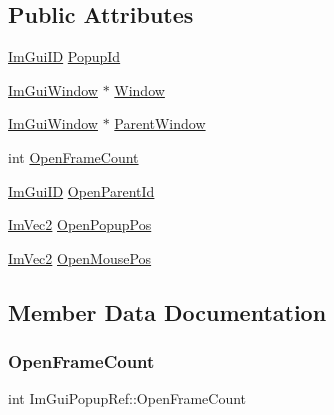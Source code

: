 \subsection*{Public Attributes}
\begin{DoxyCompactItemize}
\item 
\mbox{\hyperlink{imgui_8h_a1785c9b6f4e16406764a85f32582236f}{Im\+Gui\+ID}} \mbox{\hyperlink{struct_im_gui_popup_ref_a7037780575e28439414d28625a495bad}{Popup\+Id}}
\item 
\mbox{\hyperlink{struct_im_gui_window}{Im\+Gui\+Window}} $\ast$ \mbox{\hyperlink{struct_im_gui_popup_ref_a471027209038d1d59280a84c8d236f34}{Window}}
\item 
\mbox{\hyperlink{struct_im_gui_window}{Im\+Gui\+Window}} $\ast$ \mbox{\hyperlink{struct_im_gui_popup_ref_a7925cc312e5632661e0e6a2195af21b2}{Parent\+Window}}
\item 
int \mbox{\hyperlink{struct_im_gui_popup_ref_ae234b7164134a20ab0f25fd3987692ed}{Open\+Frame\+Count}}
\item 
\mbox{\hyperlink{imgui_8h_a1785c9b6f4e16406764a85f32582236f}{Im\+Gui\+ID}} \mbox{\hyperlink{struct_im_gui_popup_ref_a4a1431f380b456cbdacf550986715609}{Open\+Parent\+Id}}
\item 
\mbox{\hyperlink{struct_im_vec2}{Im\+Vec2}} \mbox{\hyperlink{struct_im_gui_popup_ref_a2e16a9956b94737f177d669bbaf68761}{Open\+Popup\+Pos}}
\item 
\mbox{\hyperlink{struct_im_vec2}{Im\+Vec2}} \mbox{\hyperlink{struct_im_gui_popup_ref_ac7c323da1a0ab658494a7d875facc200}{Open\+Mouse\+Pos}}
\end{DoxyCompactItemize}


\subsection{Member Data Documentation}
\mbox{\label{struct_im_gui_popup_ref_ae234b7164134a20ab0f25fd3987692ed}} 
\subsubsection{\texorpdfstring{Open\+Frame\+Count}{OpenFrameCount}}
{\footnotesize\ttfamily int Im\+Gui\+Popup\+Ref\+::\+Open\+Frame\+Count}

\mbox{\label{struct_im_gui_popup_ref_ac7c323da1a0ab658494a7d875facc200}} 
